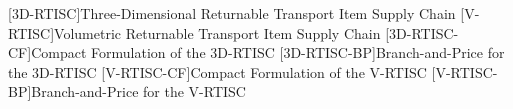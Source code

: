 

[3D-RTISC]{Three-Dimensional Returnable Transport Item Supply Chain}
[V-RTISC]{Volumetric Returnable Transport Item Supply Chain}
[3D-RTISC-CF]{Compact Formulation of the 3D-RTISC}
[3D-RTISC-BP]{Branch-and-Price for the 3D-RTISC}
[V-RTISC-CF]{Compact Formulation of the V-RTISC}
[V-RTISC-BP]{Branch-and-Price for the V-RTISC}
